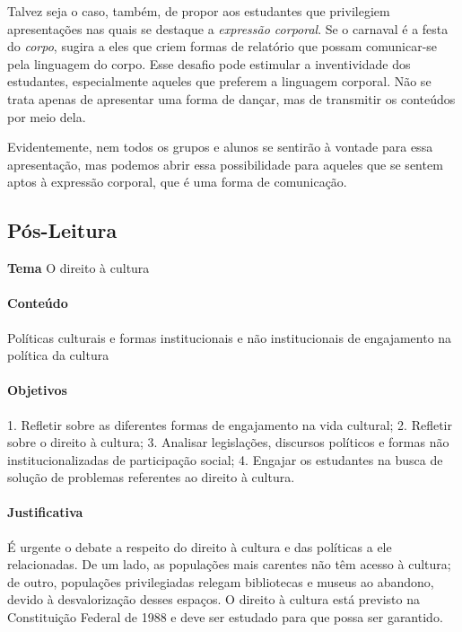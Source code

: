 \documentclass[11pt]{extarticle}
\begin{document}
Talvez seja o caso, também, de propor aos estudantes que privilegiem
apresentações nas quais se destaque a \emph{expressão corporal}. Se o
carnaval é a festa do \emph{corpo}, sugira a eles que criem formas de
relatório que possam comunicar-se pela linguagem do corpo. Esse desafio
pode estimular a inventividade dos estudantes, especialmente aqueles que
preferem a linguagem corporal. Não se trata apenas de apresentar uma
forma de dançar, mas de transmitir os conteúdos por meio dela.

Evidentemente, nem todos os grupos e alunos se sentirão à vontade para
essa apresentação, mas podemos abrir essa possibilidade para aqueles que
se sentem aptos à expressão corporal, que é uma forma de comunicação.

\subsection{Pós-Leitura}


\textbf{Tema} O direito à cultura

\paragraph{Conteúdo} Políticas culturais e formas institucionais e não
institucionais de engajamento na política da cultura

\paragraph{Objetivos} 1. Refletir sobre as diferentes formas de
engajamento na vida cultural; 2. Refletir sobre o direito à cultura; 3.
Analisar legislações, discursos políticos e formas não
institucionalizadas de participação social; 4. Engajar os estudantes na
busca de solução de problemas referentes ao direito à cultura.

\paragraph{Justificativa} É urgente o debate a respeito do direito à
cultura e das políticas a ele relacionadas. De um lado, as populações
mais carentes não têm acesso à cultura; de outro, populações
privilegiadas relegam bibliotecas e museus ao abandono, devido à
desvalorização desses espaços. O direito à cultura está previsto na
Constituição Federal de 1988 e deve ser estudado para que possa ser
garantido.
\end{document}
